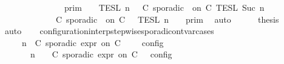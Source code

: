 \begin{isabellebody}
\ \ \ \ \ \ \ \ \ \ \ \ {\isasymunion}\ {\isasymlbrakk}{\isasymlbrakk}\ {\isasymGamma}\ {\isasymrbrakk}{\isasymrbrakk}\isactrlsub p\isactrlsub r\isactrlsub i\isactrlsub m\ {\isasyminter}\ {\isasymlbrakk}{\isasymlbrakk}\ {\isasymPsi}\ {\isasymrbrakk}{\isasymrbrakk}\isactrlsub T\isactrlsub E\isactrlsub S\isactrlsub L\isactrlbsup {\isasymge}\ n\isactrlesup \ {\isasyminter}\ {\isasymlbrakk}\ C\ sporadic\ {\isasymtau}\ on\ C\ {\isasymrbrakk}\isactrlsub T\isactrlsub E\isactrlsub S\isactrlsub L\isactrlbsup {\isasymge}\ Suc\ n\isactrlesup \isanewline
\ \ \ \ \ \ \ \ \ \ \ {\isacharequal}\ {\isasymlbrakk}{\isasymlbrakk}\ {\isacharparenleft}C\ sporadic\ {\isasymtau}\ on\ C\ {\isacharhash}\ {\isasymPsi}\ {\isasymrbrakk}{\isasymrbrakk}\isactrlsub T\isactrlsub E\isactrlsub S\isactrlsub L\isactrlbsup {\isasymge}\ n\isactrlesup \ {\isasyminter}\ {\isasymlbrakk}{\isasymlbrakk}\ {\isasymGamma}\ {\isasymrbrakk}{\isasymrbrakk}\isactrlsub p\isactrlsub r\isactrlsub i\isactrlsub m{\isacartoucheclose}\ \isamarkupfalse%
\ auto\isanewline
\ \ \ \ \isamarkupfalse%
\ {\isacharquery}thesis\ \isamarkupfalse%
\ auto\isanewline
\ \ \isamarkupfalse%
\isanewline
{}\isamarkupfalse%
%
\endisatagproof
{\isafoldproof}%
%
\isadelimproof
\isanewline
%
\endisadelimproof
\isanewline
{}\isamarkupfalse%
\ configuration{\isacharunderscore}interp{\isacharunderscore}stepwise{\isacharunderscore}sporadicon{\isacharunderscore}tvar{\isacharunderscore}cases{\isacharcolon}\isanewline
\ \ \ {\isacartoucheopen}{\isasymlbrakk}\ {\isasymGamma}{\isacharcomma}\ n\ {\isasymturnstile}\ {\isacharparenleft}{\isacharparenleft}C\ sporadic{\isasymsharp}\ {\isasymtau}\isactrlsub e\isactrlsub x\isactrlsub p\isactrlsub r\ on\ C\ {\isacharhash}\ {\isasymPsi}{\isacharparenright}\ {\isasymtriangleright}\ {\isasymPhi}\ {\isasymrbrakk}\isactrlsub c\isactrlsub o\isactrlsub n\isactrlsub f\isactrlsub i\isactrlsub g\isanewline
\ \ \ \ {\isacharequal}\ {\isasymlbrakk}\ {\isasymGamma}{\isacharcomma}\ n\ {\isasymturnstile}\ {\isasymPsi}\ {\isasymtriangleright}\ {\isacharparenleft}{\isacharparenleft}C\ sporadic{\isasymsharp}\ {\isasymtau}\isactrlsub e\isactrlsub x\isactrlsub p\isactrlsub r\ on\ C\ {\isacharhash}\ {\isasymPhi}{\isacharparenright}\ {\isasymrbrakk}\isactrlsub c\isactrlsub o\isactrlsub n\isactrlsub f\isactrlsub i\isactrlsub g\isanewline

\end{isabellebody}
